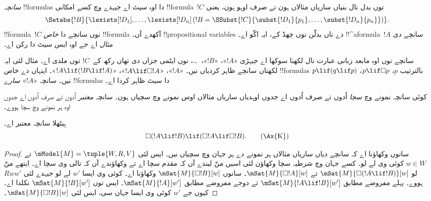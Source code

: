 \documentclass[../../../include/open-logic-section]{subfiles}
\begin{document}


\begin{defn}
  \emph{سانچہ} !!{formula}s دا اوہ سیٹ اے جیہدے وچ کسے امکانی !!{formula}~$!C$ توں بدل نال بنیاں ساریاں مثالاں ہون تے صرف اوہو ہون، یعنی
  \[
  \Setabs{!B}{\lexists[!D_1], \dots, \lexists[!D_n] \left(!B =
  \SSubst{!C}{\subst{!D_1}{p_1}, \dots, \subst{!D_n}{p_n}} \right) }.
  \]
  !!{formula}~$!C$ نوں سانچے دا \emph{خاص} !!{formula} آکھدے آں۔ !!{propositional
  variable}s دے ناں بدلّن نوں چھڈ کے، ایہ اکّو اے۔ !!^a{formula}~$!A$ سانچے دی \emph{مثال} اے جے اوہ ایس سیٹ دا رکن اے۔
\end{defn}

سانچے نوں اوہ مابعد زبانی عبارت نال لکھنا سوکھا اے جیہڑی «$!A$»، «$!B$»،~\dots، نوں ایٹمی جزاں دی تھاں رکھ کے~$!C$ توں ملدی اے۔ مثال لئی ایہ لکھتاں سانچے ظاہر کردیاں نیں۔
«$!A$»، «$!A \lif \Box!A$»، «$!A \lif (!B \lif !A)$»۔ اینہاں دے خاص !!{formula}s بالترتیب $p$، $p \lif \Box p$، $p \lif (q
\lif p)$ نیں۔ سانچہ «$!A$» \emph{سارے} !!{formula}s دا سیٹ ظاہر کردا اے۔

\begin{defn}
  کوئی سانچہ نمونے وچ \emph{سچا} اُدوں تے صرف اُدوں اے جدوں اوہدیاں ساریاں مثالاں اوس نمونے وچ سچیاں ہون۔ سانچہ \emph{معتبر} اُدوں تے صرف اُدوں اے جدوں اوہ ہر نمونے وچ سچا ہووے۔
\end{defn}

\begin{prop}
  ہِیٹھلا سانچہ  معتبر اے۔
  \begin{equation*}
  \Box(!A \lif !B) \lif (\Box !A \lif \Box !B). \tag{\Ax{K}}
  \end{equation*}
\end{prop}

\begin{proof}
  سانوں وکھاؤنا اے کہ سانچے دیاں ساریاں مثالاں ہر نمونے دے ہر جہان وچ سچیاں نیں۔ ایس لئی $\mModel{M} = \tuple{W,R,V}$ تے $w \in
  W$ کوئی وی لے لو۔ کسے جہان وچ شرطیہ سچا وکھاؤن لئی اسیں منّ لیندے آں کہ مقدم سچا اے تے وکھاؤندے آں کہ تالی وی سچا اے۔ ایتھے منّ لو $\mSat{M}{\Box(!A \lif !B)}[w]$ تے
  $\mSat{M}{\Box !A}[w]$۔ سانوں $\mSat{M}{\Box !B}[w]$ وکھاؤنا اے۔ کوئی وی ایسا $w'$ لے لو جیہدے لئی $Rww'$ ہووے۔ پہلے مفروضے مطابق
  $\mSat{M}{!A \lif !B}[w']$ تے دوجے مفروضے مطابق
  $\mSat{M}{!A}[w']$۔ ایس توں $\mSat{M}{!B}[w']$ نکلدا اے۔ کیوں جے $w'$ کوئی وی ایسا جہان سی، ایس لئی $\mSat{M}{\Box !B}[w]$۔
\end{proof}
\end{document}
